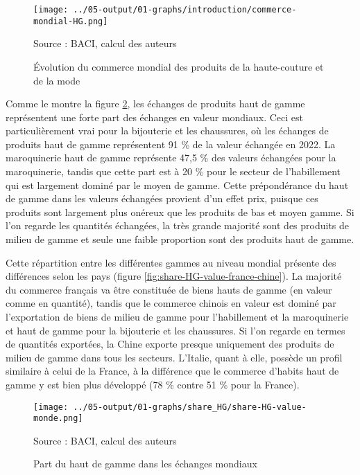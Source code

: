\documentclass[french,10pt,a4paper]{article}
\begin{document}
\begin{figure}[!h]
  \centering
  \texttt{[image: ../05-output/01-graphs/introduction/commerce-mondial-HG.png]}
  \captionsetup{justification=raggedright,singlelinecheck=false, font=small}
  \caption*{Source : BACI, calcul des auteurs}
  \captionsetup{justification=centering, singlelinecheck=true, font=normalsize}
  \caption{Évolution du commerce mondial des produits de la haute-couture et de la mode}
  \label{fig:commerce-mondial-HG}
\end{figure}


Comme le montre la figure \ref{fig:share-HG-value-monde}, les échanges de produits haut de gamme représentent une forte part des échanges en valeur mondiaux. Ceci est particulièrement vrai pour la bijouterie et les chaussures, où les échanges de produits haut de gamme représentent 91 \% de la valeur échangée en 2022. La maroquinerie haut de gamme représente 47,5 \% des valeurs échangées pour la maroquinerie, tandis que cette part est à 20 \% pour le secteur de l'habillement qui est largement dominé par le moyen de gamme. Cette prépondérance du haut de gamme dans les valeurs échangées provient d'un effet prix, puisque ces produits sont largement plus onéreux que les produits de bas et moyen gamme. Si l'on regarde les quantités échangées, la très grande majorité sont des produits de milieu de gamme et seule une faible proportion sont des produits haut de gamme.

Cette répartition entre les différentes gammes au niveau mondial présente des différences selon les pays (figure \ref{fig:share-HG-value-france-chine}). La majorité du commerce français va être constituée de biens hauts de gamme (en valeur comme en quantité), tandis que le commerce chinois en valeur est dominé par l'exportation de biens de milieu de gamme pour l'habillement et la maroquinerie et haut de gamme pour la bijouterie et les chaussures. Si l'on regarde en termes de quantités exportées, la Chine exporte presque uniquement des produits de milieu de gamme dans tous les secteurs. L'Italie, quant à elle, possède un profil similaire à celui de la France, à la différence que le commerce d'habits haut de gamme y est bien plus développé (78 \% contre 51 \% pour la France).

\begin{figure}[!h]
  \centering
  \texttt{[image: ../05-output/01-graphs/share\_HG/share-HG-value-monde.png]}
  \captionsetup{justification=raggedright,singlelinecheck=false, font=small}
  \caption*{Source : BACI, calcul des auteurs}
  \captionsetup{justification=centering, singlelinecheck=true, font=normalsize}
  \caption{Part du haut de gamme dans les échanges mondiaux}
  \label{fig:share-HG-value-monde}
\end{figure}
\end{document}
